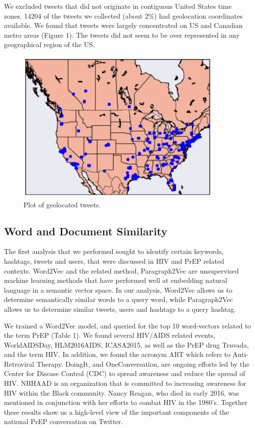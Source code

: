 \documentclass{sig-alternate-05-2015}
\begin{document}
We excluded tweets that did not originate in contiguous United States time zones. 14204 of the tweets we collected (about 2\%) had geolocation coordinates available. We found that tweets were largely concentrated on US and Canadian metro areas (Figure 1). The tweets did not seem to be over represented in any geographical region of the US.


\begin{figure}
\centering
\includegraphics[height=3in, width=4in]{map}
\caption{Plot of geolocated tweets.}
\end{figure}

\subsection{Word and Document Similarity}

The first analysis that we performed sought to identify certain keywords, hashtags, tweets and users, that were discussed in HIV and PrEP related contexts. Word2Vec and the related method, Paragraph2Vec are unsupervised machine learning methods that have performed well at embedding natural language in a semantic vector space. In our analysis, Word2Vec allows us to determine semantically similar words to a query word, while Paragraph2Vec allows us to determine similar tweets, users and hashtags to a query hashtag.

We trained a Word2Vec model, and queried for the top 10 word-vectors related to the term PrEP (Table 1). We found several HIV/AIDS related events, WorldAIDSDay, HLM2016AIDS, ICASA2015, as well as the PrEP drug Truvada, and the term HIV. In addition, we found the acronym ART which refers to Anti-Retroviral Therapy. DoingIt, and OneConversation, are ongoing efforts led by the Center for Disease Control (CDC) to spread awareness and reduce the spread of HIV. NBHAAD is an organization that is committed to increasing awareness for HIV within the Black community. Nancy Reagan, who died in early 2016, was mentioned in conjunction with her efforts to combat HIV in the 1980's. Together these results show us a high-level view of the important components of the national PrEP conversation on Twitter.
\end{document}
